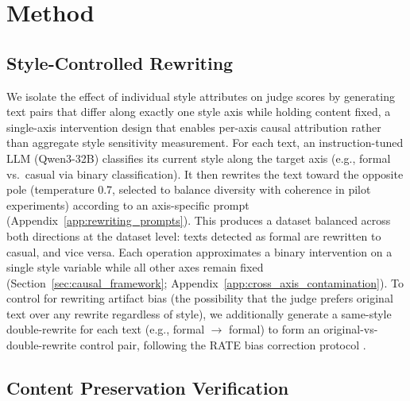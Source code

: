 \section{Method}
\label{sec:method}

\subsection{Style-Controlled Rewriting}
\label{sec:rewriting}

We isolate the effect of individual style attributes on judge scores by generating text pairs that differ along exactly one style axis while holding content fixed, a single-axis intervention design that enables per-axis causal attribution rather than aggregate style sensitivity measurement.
For each text, an instruction-tuned LLM (Qwen3-32B) classifies its current style along the target axis (e.g., formal vs.\ casual via binary classification).
It then rewrites the text toward the opposite pole (temperature 0.7, selected to balance diversity with coherence in pilot experiments) according to an axis-specific prompt (Appendix~\ref{app:rewriting_prompts}).
This produces a dataset balanced across both directions at the dataset level: texts detected as formal are rewritten to casual, and vice versa.
Each operation approximates a binary intervention on a single style variable while all other axes remain fixed (Section~\ref{sec:causal_framework}; Appendix~\ref{app:cross_axis_contamination}).
To control for rewriting artifact bias (the possibility that the judge prefers original text over any rewrite regardless of style), we additionally generate a same-style double-rewrite for each text (e.g., formal $\to$ formal) to form an original-vs-double-rewrite control pair, following the RATE bias correction protocol \citep{reber2025rate}.

\subsection{Content Preservation Verification}
\label{sec:nli_gate}

